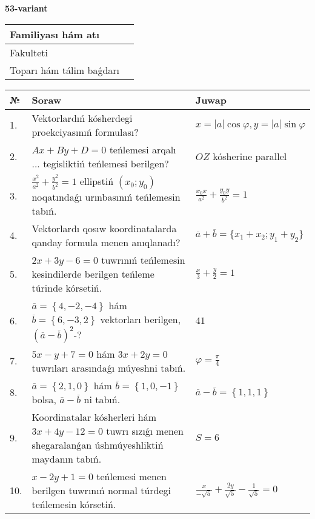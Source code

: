 \documentclass{article}
\begin{document}
\egroup

\newpage


\textbf{53-variant}\\

\bgroup
\def\arraystretch{1.6} %

\begin{tabular}{|m{5.7cm}|m{9.5cm}|}
\hline
Familiyası hám atı & \\
\hline
Fakulteti  & \\
\hline
Toparı hám tálim baǵdarı  & \\
\hline
\end{tabular}

\vspace{1cm}

\begin{tabular}{|m{0.7cm}|m{10cm}|m{4cm}|}
\hline
№ & Soraw & Juwap \\
\hline
1. & Vektorlardıń kósherdegi proekciyasınıń formulası? & $x=|a|\cos\varphi, y=|a|\sin\varphi$ \\
\hline
2. & $Ax+By+D=0$ teńlemesi arqalı ... tegisliktiń teńlemesi berilgen? & $OZ$ kósherine parallel \\
\hline
3. & $\frac{x^2}{a^2}+\frac{y^2}{b^2}=1$ ellipstiń $(x_0;y_0)$ noqatındaǵı urınbasınıń teńlemesin tabıń. & $\frac{x_0x}{a^2}+\frac{y_0y}{b^2}=1$ \\
\hline
4. & Vektorlardı qosıw koordinatalarda qanday formula menen anıqlanadı? & $\overline{a}+\overline{b}=\{x_1+x_2;y_1+y_2\}$ \\
\hline
5. & $2x+3y-6=0$ tuwrınıń teńlemesin kesindilerde berilgen teńleme túrinde kórsetiń. & $\frac{x}{3} + \frac{ y }{ 2 } =  1$ \\
\hline
6. & $\overline{a}=\left\{ 4,-2,-4 \right\}$ hám $\overline{b}=\left\{ 6,-3, 2 \right\}$ vektorları berilgen, $(\overline{a}-\overline{b}) ^{2}$-? & $41$ \\
\hline
7. & $5x-y+7=0$ hám $3x+2y=0$ tuwrıları arasındaǵı múyeshni tabıń. & $\varphi=\frac{\pi}{4}$ \\
\hline
8. & $\overline{a}=\left\{ 2, 1, 0 \right\}$ hám $\overline{b}=\left\{ 1, 0,-1 \right\}$ bolsa, $\overline{a}-\overline{b}$ ni tabıń. & $\overline{a} -\overline{b} = \left\{ 1,1,1 \right\}$ \\
\hline
9. & Koordinatalar kósherleri hám $ 3x+4y-12=0 $ tuwrı sızıǵı menen shegaralanǵan úshmúyeshliktiń maydanın tabıń. & $ S=6 $ \\
\hline
10. & $x-2y+1=0$ teńlemesi menen berilgen tuwrınıń normal túrdegi teńlemesin kórsetiń. & $\frac{x}{- \sqrt{5}}+\frac{2y}{\sqrt{5}}-\frac{1}{\sqrt{5}}=0$ \\
\hline
\end{tabular}
\end{document}
